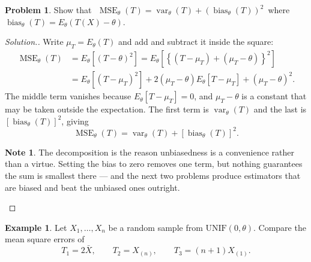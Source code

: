 \documentclass[12pt,a4paper]{report}
\theoremstyle{definition}
\newtheorem{exa}[thm]{Example}
\newtheorem*{note}{Note}
\DeclareMathOperator{\var}{var}
\DeclareMathOperator{\bias}{bias}
\DeclareMathOperator{\MSE}{MSE}
\newtheorem{problemx}{Problem}[section]
\newenvironment{problem}{\begin{problemx}}{\end{problemx}}
\newenvironment{solution}
  {\renewcommand{\qedsymbol}{}\begin{proof}[\textit{Solution}.]}
  {\end{proof}}
\begin{document}
\begin{problem}
\label{prob:msedecomp}
Show that $\,\, \MSE _{\theta} (T) = \var _{\theta}(T) + \left(\bias _{\theta}(T)\right)^2\,$ where $\bias _{\theta}(T) = E_{\theta}\left(T(X) - \theta\right)$.
\end{problem}

\begin{solution}
Write $\mu_T = E_{\theta}\left(T\right)$ and add and subtract it inside the
square:
\begin{align*}
\MSE _{\theta}(T) &= E_{\theta}\left[\left(T-\theta\right)^{2}\right]
 = E_{\theta}\left[\left\{\left(T-\mu_T\right) + \left(\mu_T-\theta\right)\right\}^{2}\right]\\
 &= E_{\theta}\left[\left(T-\mu_T\right)^{2}\right]
  + 2\left(\mu_T-\theta\right)E_{\theta}\left[T-\mu_T\right]
  + \left(\mu_T-\theta\right)^{2}.
\end{align*}
The middle term vanishes because $E_{\theta}\left[T-\mu_T\right]=0$, and
$\mu_T-\theta$ is a constant that may be taken outside the expectation. The first
term is $\var _{\theta}(T)$ and the last is $\left[\bias _{\theta}(T)\right]^{2}$,
giving
\[\MSE _{\theta}(T) = \var _{\theta}(T) + \left[\bias _{\theta}(T)\right]^{2}.\]

\begin{note}
The decomposition is the reason unbiasedness is a convenience rather than a
virtue. Setting the bias to zero removes one term, but nothing guarantees the
sum is smallest there --- and the next two problems produce estimators that are
biased and beat the unbiased ones outright.
\end{note}
\end{solution}

\begin{exa}
\label{ex:uniformmse}
Let $X_1, \dots, X_n$ be a random sample from $\text{UNIF}(0, \theta)$. Compare the
mean square errors of
\[T_1 = 2\bar X,\qquad T_2 = X_{(n)},\qquad T_3 = (n + 1)X_{(1)} .\]
\end{exa}
\end{document}
